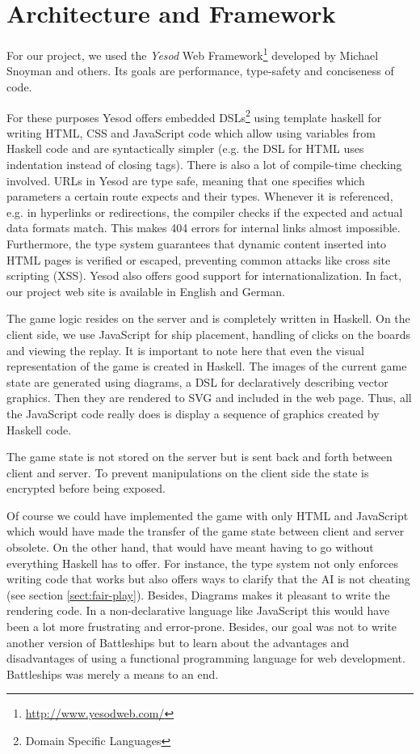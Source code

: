 \documentclass[a4paper]{easychair}
\begin{document}
\section{Architecture and Framework}

For our project, we used the \emph{Yesod} Web Framework\footnote{\url{http://www.yesodweb.com/}} developed by Michael Snoyman and others. Its goals are performance, type-safety and conciseness of code.

For these purposes Yesod offers embedded DSLs\footnote{Domain Specific Languages} using template haskell for writing HTML, CSS and JavaScript code which allow using variables from Haskell code and are syntactically simpler (e.g. the DSL for HTML uses indentation instead of closing tags). There is also a lot of compile-time checking involved. URLs in Yesod are type safe, meaning that one specifies which parameters a certain route expects and their types. Whenever it is referenced, e.g. in hyperlinks or redirections, the compiler checks if the expected and actual data formats match. This makes 404 errors for internal links almost impossible. Furthermore, the type system guarantees that dynamic content inserted into HTML pages is verified or escaped, preventing common attacks like cross site scripting (XSS). Yesod also offers good support for internationalization. In fact, our project web site is available in English and German.

The game logic resides on the server and is completely written in Haskell. On the client side, we use JavaScript for ship placement, handling of clicks on the boards and viewing the replay. It is important to note here that even the visual representation of the game is created in Haskell. The images of the current game state are generated using diagrams, a DSL for declaratively describing vector graphics. Then they are rendered to SVG and included in the web page. Thus, all the JavaScript code really does is display a sequence of graphics created by Haskell code. 

The game state is not stored on the server but is sent back and forth between client and server. To prevent manipulations on the client side the state is encrypted before being exposed.

Of course we could have implemented the game with only HTML and JavaScript which would have made the transfer of the game state between client and server obsolete. On the other hand, that would have meant having to go without everything Haskell has to offer. For instance, the type system not only enforces writing code that works but also offers ways to clarify that the AI is not cheating (see section \ref{sect:fair-play}). Besides, Diagrams makes it pleasant to write the rendering code. In a non-declarative language like JavaScript this would have been a lot more frustrating and error-prone. Besides, our goal was not to write another version of Battleships but to learn about the advantages and disadvantages of using a functional programming language for web development. Battleships was merely a means to an end.
\end{document}
